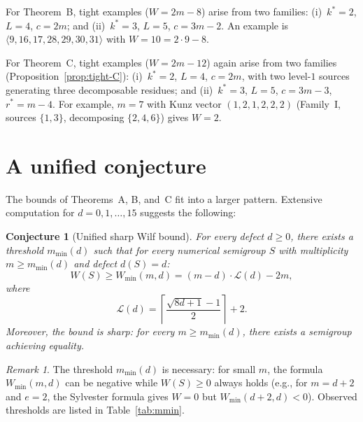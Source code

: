 \documentclass[11pt]{amsart}
\newtheorem{conjecture}[theorem]{Conjecture}
\theoremstyle{definition}
\theoremstyle{remark}
\newtheorem{remark}[theorem]{Remark}
\begin{document}
For Theorem~B, tight examples ($W = 2m - 8$) arise from two families:
(i)~$k^* = 2$, $L = 4$, $c = 2m$; and (ii)~$k^* = 3$, $L = 5$, $c = 3m - 2$.
An example is $\langle 9, 16, 17, 28, 29, 30, 31 \rangle$ with $W = 10 = 2 \cdot 9 - 8$.

For Theorem~C, tight examples ($W = 2m - 12$) again arise from two families
(Proposition~\ref{prop:tight-C}):
(i)~$k^* = 2$, $L = 4$, $c = 2m$, with two level-$1$ sources generating
three decomposable residues;
and (ii)~$k^* = 3$, $L = 5$, $c = 3m - 3$, $r^* = m - 4$.
For example, $m = 7$ with Kunz vector $(1, 2, 1, 2, 2, 2)$
(Family~I, sources $\{1, 3\}$, decomposing $\{2, 4, 6\}$) gives $W = 2$.

\section{A unified conjecture}\label{sec:conjecture}

The bounds of Theorems~A, B, and~C fit into a larger pattern.
Extensive computation for $d = 0, 1, \ldots, 15$ suggests the following:

\begin{conjecture}[Unified sharp Wilf bound]\label{conj:unified}
For every defect $d \ge 0$, there exists a threshold $m_{\min}(d)$
such that for every numerical semigroup $S$ with multiplicity $m \ge m_{\min}(d)$
and defect $d(S) = d$:
\begin{equation}\label{eq:unified}
  W(S) \ge W_{\min}(m, d) = (m - d) \cdot \mathcal{L}(d) - 2m,
\end{equation}
where
\begin{equation}\label{eq:L-function}
  \mathcal{L}(d) = \left\lceil \frac{\sqrt{8d + 1} - 1}{2} \right\rceil + 2.
\end{equation}
Moreover, the bound is sharp: for every $m \ge m_{\min}(d)$, there exists
a semigroup achieving equality.
\end{conjecture}

\begin{remark}
The threshold $m_{\min}(d)$ is necessary: for small $m$, the formula
$W_{\min}(m,d)$ can be negative while $W(S) \ge 0$ always holds
(e.g., for $m = d + 2$ and $e = 2$, the Sylvester formula gives $W = 0$
but $W_{\min}(d+2, d) < 0$).
Observed thresholds are listed in Table~\ref{tab:mmin}.
\end{remark}
\end{document}
